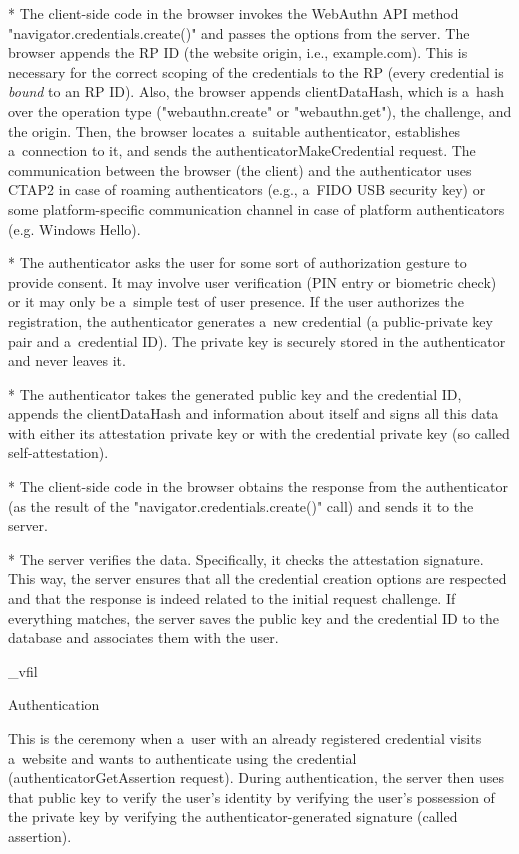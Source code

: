 * The client-side code in the browser invokes the WebAuthn API method \nl "navigator.credentials.create()" and passes the options from the server. The browser {\sbf appends the RP ID} (the website origin, i.e., example.com). This is necessary for the {\sbf correct scoping} of the credentials to the RP (every credential is  {\em bound} to an RP ID). Also, the browser appends {\sbf clientDataHash}, which is a~hash over the operation type ("webauthn.create" or "webauthn.get"), the challenge, and the origin. Then, the browser locates a~suitable authenticator, establishes a~connection to it, and sends the authenticatorMakeCredential request. The communication between the browser (the client) and the authenticator uses CTAP2 in case of roaming authenticators (e.g., a~FIDO USB security key) or some platform-specific communication channel in case of platform authenticators (e.g. Windows Hello).

* The authenticator asks the user for some sort of authorization gesture to provide consent. It may involve user verification (PIN entry or biometric check) or it may only be a~simple test of user presence. If the user authorizes the registration, the authenticator {\sbf generates a~new credential} (a public-private key pair and a~credential ID). The private key is securely stored in the authenticator and never leaves it.

* The authenticator takes {\sbf the generated public key} and {\sbf the credential ID}, appends the clientDataHash and information about itself and signs all this data with either its attestation private key or with the credential private key (so called self-attestation).

* The client-side code in the browser obtains the response from the authenticator (as the result of the "navigator.credentials.create()" call) and sends it to the server.

* The server verifies the data. Specifically, it checks the attestation signature. This way, the server ensures that all the credential creation options are respected and that the response is indeed related to the initial request challenge. If everything matches, {\sbf the server saves the public key and the credential ID to the database} and associates them with the user.

\enditems

\_vfil


\secc Authentication

This is the ceremony when a~user with an already registered credential visits a~website and wants to authenticate using the credential (authenticatorGetAssertion request). During authentication, the server then uses that {\sbf public key} to verify the user's identity by verifying the user's possession of the private key by verifying the authenticator-generated signature (called assertion).


